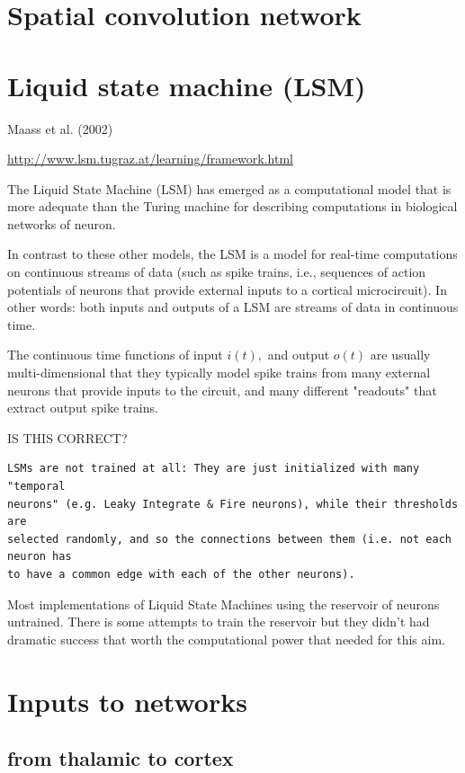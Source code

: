 \section{Spatial convolution network}


\section{Liquid state machine (LSM)}
\label{sec:liquid-state-machine}

Maass et al. (2002)

\url{http://www.lsm.tugraz.at/learning/framework.html}

The Liquid State Machine (LSM) has emerged as a computational model that is
more adequate than the Turing machine for describing computations in
biological networks of neuron.

In contrast to these other models, the LSM is a model for real-time
computations on continuous streams of data (such as spike trains, i.e.,
sequences of action potentials of neurons that provide external inputs to a
cortical microcircuit). In other words: both inputs and outputs of a LSM are
streams of data in continuous time.

The continuous time functions of input $i(t), $ and output $o(t)$ are usually
multi-dimensional that they typically model spike trains from many external
neurons that provide inputs to the circuit, and many different "readouts" that
extract output spike trains.

IS THIS CORRECT?
\begin{verbatim}
LSMs are not trained at all: They are just initialized with many "temporal
neurons" (e.g. Leaky Integrate & Fire neurons), while their thresholds are
selected randomly, and so the connections between them (i.e. not each neuron has
to have a common edge with each of the other neurons).

\end{verbatim}

Most implementations of Liquid State Machines using the reservoir of neurons
untrained. There is some attempts to train the reservoir but they didn't had
dramatic success that worth the computational power that needed for this aim.


\section{Inputs to networks}

\subsection{from thalamic to cortex}

